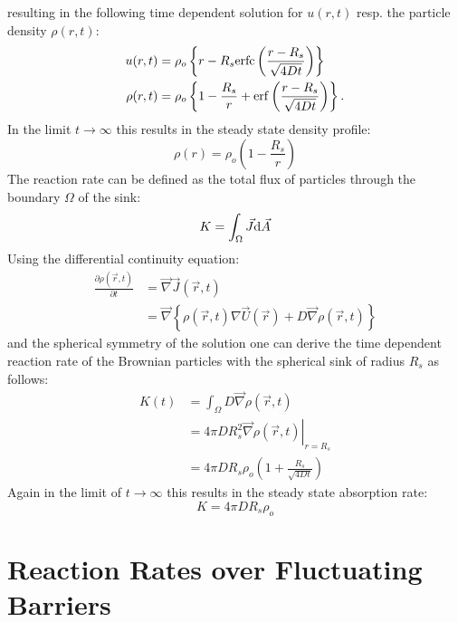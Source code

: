 resulting in the following time dependent solution for $u(r,t)$ resp. the particle density $\rho(r,t)$:
\begin{align}
    u(r,t) &= \rho_o \left\{ r - R_s {\rm erfc} \left( \frac{r - R_s}{\sqrt{4 D t}} \right) \right\} \\
    \rho(r,t) &= \rho_o \left\{ 1 - \frac{R_s}{r} + {\rm erf} \left( \frac{r - R_s}{\sqrt{4Dt}} \right) \right\}.
    \label{u(r,t)}
\end{align}
In the limit $t \rightarrow \infty$ this results in the steady state density profile:
\begin{equation}
    \rho(r) =  \rho_o \left( 1 - \frac{R_s}{r} \right)
    \label{steady_state_density}
\end{equation}
The reaction rate can be defined as the total flux of particles through the boundary $\Omega$ of the sink:
\begin{equation}
    K = \int_\Omega \vec{J} {\rm d}\vec{A} 
    \label{reaction rate}
\end{equation}
Using the differential continuity equation:
\begin{align}
    \frac{\partial \rho(\vec{r},t)}{\partial t}&= \vec{\nabla} \vec{J}(\vec{r},t) \\
    &= \vec{\nabla} \left\{ \rho(\vec{r},t) \nabla \vec{U}(\vec{r}) + D \vec{\nabla} \rho(\vec{r},t) \right\}
    \label{contiuity equation}
\end{align}
and the spherical symmetry of the solution one can derive the time dependent reaction rate of the Brownian particles with the spherical sink of radius $R_s$ as follows:
\begin{align}
    K(t) &= \int_\Omega D  \vec{\nabla} \rho(\vec{r},t) \\
    &= 4 \pi D R_s^2 \left. \vec{\nabla} \rho(\vec{r},t) \right|_{r = R_s}\\
    &= 4 \pi D R_s \rho_o \left( 1 + \frac{R_s}{\sqrt{4Dt}} \right)
    \label{ideal reaction rate}
\end{align}
Again in the limit of $t \rightarrow \infty$ this results in the steady state absorption rate:
\begin{equation}
    K = 4 \pi D R_s \rho_o
    \label{steady state ideal rate}
\end{equation}


\section{Reaction Rates over Fluctuating Barriers}
